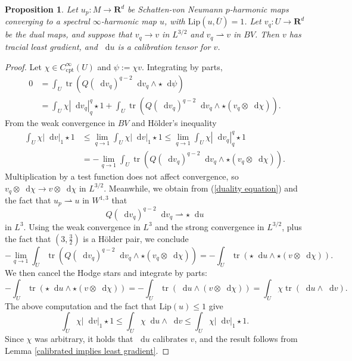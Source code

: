 \documentclass[reqno,11pt]{amsart}
\newcommand{\RR}{\mathbf{R}}
\newcommand*\dif{\mathop{}\!\mathrm{d}}
\DeclareMathOperator{\tr}{tr}
\newcommand{\Lip}{\mathrm{Lip}}
\newcommand{\cpt}{\mathrm{cpt}}
\newtheorem{proposition}[theorem]{Proposition}
\newcommand{\weakto}{\rightharpoonup}
\theoremstyle{definition}
\numberwithin{equation}{section}
\begin{document}
\begin{proposition}\label{constructing the dual map}
Let $u_p: M \to \RR^d$ be Schatten-von Neumann $p$-harmonic maps converging to a spectral $\infty$-harmonic map $u$, with $\Lip(u, \overline U) = 1$.
Let $v_q: U \to \RR^d$ be the dual maps, and suppose that $v_q \to v$ in $L^{3/2}$ and $v_q \weakto v$ in $BV$.
Then $v$ has tracial least gradient, and $\dif u$ is a calibration tensor for $v$.
\end{proposition}
\begin{proof}
Let $\chi \in C^\infty_\cpt(U)$ and $\psi := \chi v$.
Integrating by parts,
\begin{align*}
0 &= \int_U \tr(Q(\dif v_q)^{q - 2} \dif v_q \wedge \star \dif \psi) \\
&= \int_U \chi|\dif v_q|_{q}^q \star 1 + \int_U \tr(Q(\dif v_q)^{q - 2} \dif v_q \wedge \star (v_q \otimes \dif \chi)).
\end{align*}
From the weak convergence in $BV$ and H\"older's inequality
\begin{align*}
\int_U \chi|\dif v|_{1} \star 1
&\leq \lim_{q \to 1} \int_U \chi |\dif v|_1 \star 1 
\leq \lim_{q \to 1} \int_U \chi|\dif v_q|_q^q \star 1 \\
&= -\lim_{q \to 1} \int_U \tr(Q(\dif v_q)^{q - 2} \dif v_q \wedge \star (v_q \otimes \dif \chi)).
\end{align*}
Multiplication by a test function does not affect convergence, so $v_q \otimes \dif \chi \to v \otimes \dif \chi$ in $L^{3/2}$.
Meanwhile, we obtain from (\ref{duality equation}) and the fact that $u_p \weakto u$ in $W^{1, 3}$ that
$$Q(\dif v_q)^{q - 2} \dif v_q \weakto \star \dif u$$
in $L^3$.
Using the weak convergence in $L^3$ and the strong convergence in $L^{3/2}$, plus the fact that $(3, \frac{3}{2})$ is a H\"older pair, we conclude
$$-\lim_{q \to 1} \int_U \tr(Q(\dif v_q)^{q - 2} \dif v_q \wedge \star (v_q \otimes \dif \chi)) = -\int_U \tr(\star \dif u \wedge \star (v \otimes \dif \chi)).$$
We then cancel the Hodge stars and integrate by parts:
$$-\int_U \tr(\star \dif u \wedge \star (v \otimes \dif \chi)) = -\int_U \tr(\dif u \wedge (v \otimes \dif \chi)) = \int_U \chi \tr(\dif u \wedge \dif v).$$
The above computation and the fact that $\Lip(u) \leq 1$ give
$$\int_U \chi|\dif v|_{1} \star 1 \leq \int_U \chi\dif u \wedge \dif v \leq \int_U \chi|\dif v|_{1} \star 1.$$
Since $\chi$ was arbitrary, it holds that $\dif u$ calibrates $v$, and the result follows from Lemma \ref{calibrated implies least gradient}.
\end{proof}
\end{document}
